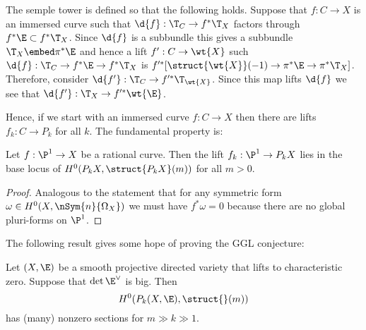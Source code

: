 \documentclass[12pt]{article}
\begin{document}
The semple tower is defined so that the following holds. Suppose that $f : C \to X$ is an immersed curve such that $\d{f} : \T_C \to f^* \T_X$ factors through $f^* \E \subset f^* \T_X$. Since $\d{f}$ is a subbundle this gives a subbundle $\T_X \embed \pi^* \E$ and hence a lift $f' : C \to \wt{X}$ such $\d{f} : \T_C \to f^* \E \to f^* \T_X$ is $f'^* [\struct{\wt{X}}(-1) \to \pi^* \E \to \pi^* \T_X]$. Therefore, consider $\d{f'} : \T_C \to f'^* \T_{\wt{X}}$. Since this map lifts $\d{f}$ we see that $\d{f'} : \T_X \to f'^* \wt{\E}$.

Hence, if we start with an immersed curve $f : C \to X$ then there are lifts $f_k : C \to P_k$ for all $k$. The fundamental property is:

\begin{prop}
Let $f : \P^1 \to X$ be a rational curve. Then the lift $f_k : \P^1 \to P_k X$ lies in the base locus of $H^0(P_k X, \struct{P_k X}(m))$ for all $m > 0$.
\end{prop}

\begin{proof}
Analogous to the statement that for any symmetric form $\omega \in H^0(X, \nSym{n}{\Omega_X})$ we must have $f^* \omega = 0$ because there are no global pluri-forms on $\P^1$.
\end{proof}

The following result gives some hope of proving the GGL conjecture:

\begin{theorem}
Let $(X, \E)$ be a smooth projective directed variety that lifts to characteristic zero. Suppose that $\det{\E^\vee}$ is big. Then
\[ H^0(P_k(X, \E), \struct{}(m)) \]
has (many) nonzero sections for $m \gg k \gg 1$.
\end{theorem}
\end{document}
